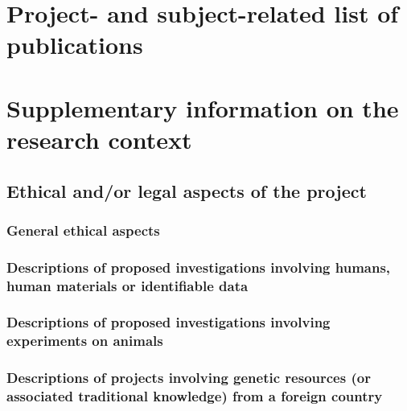 \documentclass[final]{scrartcl}
\begin{document}
\section{Project- and subject-related list of publications}
\label{sec:bib}

\backmatter
\section{Supplementary information on the research context}

\subsection{Ethical and/or legal aspects of the project}

\subsubsection{General ethical aspects}

\subsubsection{Descriptions of proposed investigations involving humans, human materials or identifiable data}

\subsubsection{Descriptions of proposed investigations involving experiments on animals}

\subsubsection{Descriptions of projects involving genetic resources (or associated traditional knowledge) from a foreign country}
\end{document}
